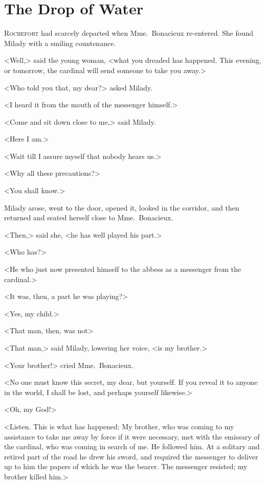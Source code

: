 
\chapter{The Drop of Water}

\lettrine{R}{ochefort} had scarcely departed when Mme.~Bonacieux re-entered. She found Milady with a smiling countenance. 

\zz
<Well,> said the young woman, <what you dreaded has happened. This evening, or tomorrow, the cardinal will send someone to take you away.> 

<Who told you that, my dear?> asked Milady. 

<I heard it from the mouth of the messenger himself.> 

<Come and sit down close to me,> said Milady. 

<Here I am.> 

<Wait till I assure myself that nobody hears us.> 

<Why all these precautions?> 

<You shall know.> 

Milady arose, went to the door, opened it, looked in the corridor, and then returned and seated herself close to Mme.~Bonacieux. 

<Then,> said she, <he has well played his part.> 

<Who has?> 

<He who just now presented himself to the abbess as a messenger from the cardinal.> 

<It was, then, a part he was playing?> 

<Yes, my child.> 

<That man, then, was not\longdash> 

<That man,> said Milady, lowering her voice, <is my brother.> 

<Your brother!> cried Mme.~Bonacieux. 

<No one must know this secret, my dear, but yourself. If you reveal it to anyone in the world, I shall be lost, and perhaps yourself likewise.> 

<Oh, my God!> 

<Listen. This is what has happened: My brother, who was coming to my assistance to take me away by force if it were necessary, met with the emissary of the cardinal, who was coming in search of me. He followed him. At a solitary and retired part of the road he drew his sword, and required the messenger to deliver up to him the papers of which he was the bearer. The messenger resisted; my brother killed him.> 

